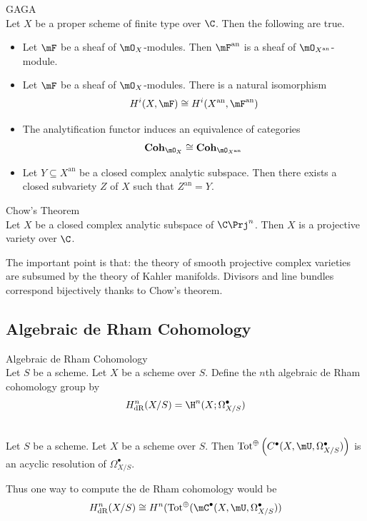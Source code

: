 \documentclass[a4paper]{article}
\begin{document}
\begin{thm}{GAGA}{}\\
Let $X$ be a proper scheme of finite type over $\C$. Then the following are true. 
\begin{itemize}
\item Let $\mF$ be a sheaf of $\mO_X$-modules. Then $\mF^\text{an}$ is a sheaf of $\mO_{X^\text{an}}$-module. 
\item Let $\mF$ be a sheaf of $\mO_X$-modules. There is a natural isomorphism $$H^i(X,\mF)\cong H^i(X^\text{an},\mF^\text{an})$$
\item The analytification functor induces an equivalence of categories $$\bold{Coh}_{\mO_X}\cong\bold{Coh}_{\mO_{X^\text{an}}}$$
\item Let $Y\subseteq X^\text{an}$ be a closed complex analytic subspace. Then there exists a closed subvariety $Z$ of $X$ such that $Z^\text{an}=Y$. 
\end{itemize}
\end{thm}

\begin{crl}{Chow's Theorem}{}\\
Let $X$ be a closed complex analytic subspace of $\C\Prj^n$. Then $X$ is a projective variety over $\C$. 
\end{crl}

The important point is that: the theory of smooth projective complex varieties are subsumed by the theory of Kahler manifolds. Divisors and line bundles correspond bijectively thanks to Chow's theorem. 

\subsection{Algebraic de Rham Cohomology}
\begin{defn}{Algebraic de Rham Cohomology}{}\\
Let $S$ be a scheme. Let $X$ be a scheme over $S$. Define the $n$th algebraic de Rham cohomology group by $$H_\text{dR}^n(X/S)=\H^n(X;\Omega_{X/S}^\bullet)$$
\end{defn}

\begin{lmm}{}{}\\
Let $S$ be a scheme. Let $X$ be a scheme over $S$. Then $\text{Tot}^\oplus\left(C^\bullet(X,\mU,\Omega_{X/S}^\bullet)\right)$ is an acyclic resolution of $\Omega_{X/S}^\bullet$. 
\end{lmm}

Thus one way to compute the de Rham cohomology would be $$H_\text{dR}^n(X/S)\cong H^n(\text{Tot}^\oplus(\mC^\bullet(X,\mU,\Omega_{X/S}^\bullet))$$
\end{document}
